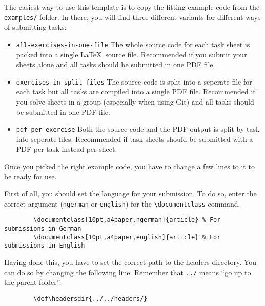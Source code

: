 \documentclass[10pt,a4paper,english]{article}
\author{Tim Schlachter (7039326)}
\def\headersdir{../headers/}
\begin{document}
    \maketitle

    \newpage
    \tableofcontents
    \newpage

    The easiest way to use this template is to copy the fitting example code from the \verb|examples/| folder.
    In there, you will find three different variants for different ways of submitting tasks:

    \begin{itemize}
        \item \verb|all-exercises-in-one-file| The whole source code for each task sheet is packed into a single \LaTeX~source file.
        Recommended if you submit your sheets alone and all tasks should be submitted in one PDF file.
        \item \verb|exercises-in-split-files| The source code is split into a seperate file for each task but all tasks are compiled into a single PDF file.
        Recommended if you solve sheets in a group (especially when using Git) and all tasks should be submitted in one PDF file. 
        \item \verb|pdf-per-exercise| Both the source code and the PDF output is split by task into seperate files.
        Recommended if task sheets should be submitted with a PDF per task instead per sheet.
    \end{itemize}

    Once you picked the right example code, you have to change a few lines to it to be ready for use.

    First of all, you should set the language for your submission.
    To do so, enter the correct argument (\verb|ngerman| or \verb|english|) for the \verb|\documentclass| command.
    \begin{verbatim}
        \documentclass[10pt,a4paper,ngerman]{article} % For submissions in German
        \documentclass[10pt,a4paper,english]{article} % For submissions in English
    \end{verbatim}

    Having done this, you have to set the correct path to the headers directory. 
    You can do so by changing the following line.
    Remember that \verb|../| means \enquote{go up to the parent folder}.
    \begin{verbatim}
        \def\headersdir{../../headers/}
    \end{verbatim}
\end{document}
